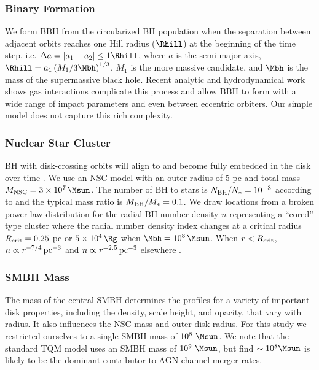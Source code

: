 \subsubsection{Binary Formation}
We form BBH from the circularized BH population when the separation between adjacent orbits reaches one Hill radius ($\Rhill$) at the beginning of the time step, i.e. $\Delta a = |a_1-a_2| \leq 1\Rhill$, where $a$ is the semi-major axis, $\Rhill = a_1 \left( M_1/3\Mbh \right)^{1/3}$, $M_1$ is the more massive candidate, and $\Mbh$ is the mass of the supermassive black hole.
Recent analytic \citep{QianLiLai24, DodiciTremaine24} and hydrodynamical work \citep{DeLaurentiis+23, Whitehead+24} shows gas interactions complicate this process and allow BBH to form with a wide range of impact parameters and even between eccentric orbiters.
Our simple model does not capture this rich complexity.

\subsubsection{Nuclear Star Cluster}
BH with disk-crossing orbits will align to and become fully embedded in the disk over time \citep{Fabj+20,Nasim+22,McKernan+22-starfall,WangZhuLin24}.
We use an NSC model with an outer radius of 5 pc and total mass $M_{\rm NSC}=3 \times 10^7\,\Msun$.
The number of BH to stars is $N_{\rm BH}/N_{*} = 10^{-3}$ according to \citet{Generozov+18} and the typical mass ratio is $M_{\rm BH}/M_{*} = 0.1$.
We draw locations from a broken power law distribution for the radial BH number density $n$ representing a ``cored'' type cluster where the radial number density index changes at a critical radius $R_{\rm crit}=0.25$ pc or $5\times10^4\,\Rg$ when $\Mbh=10^8\,\Msun$.
When $r<R_{\rm crit}$, $n\propto r^{-7/4}\,{\rm pc}^{-3}$ and $n\propto r^{-2.5}\,{\rm pc}^{-3}$ elsewhere \citep{BachallWolf76,Generozov+18}.

\subsubsection{SMBH Mass}
\label{sec:smbh-mass}
The mass of the central SMBH determines the profiles for a variety of important disk properties, including the density, scale height, and opacity, that vary with radius.
It also influences the NSC mass and outer disk radius.
For this study we restricted ourselves to a single SMBH mass of $10^8~\Msun$.
We note that the standard TQM model uses an SMBH mass of $10^9~\Msun$, but \citet{Delfavero+25} find $\sim 10^{8}\Msun$ is likely to be the dominant contributor to AGN channel merger rates.

